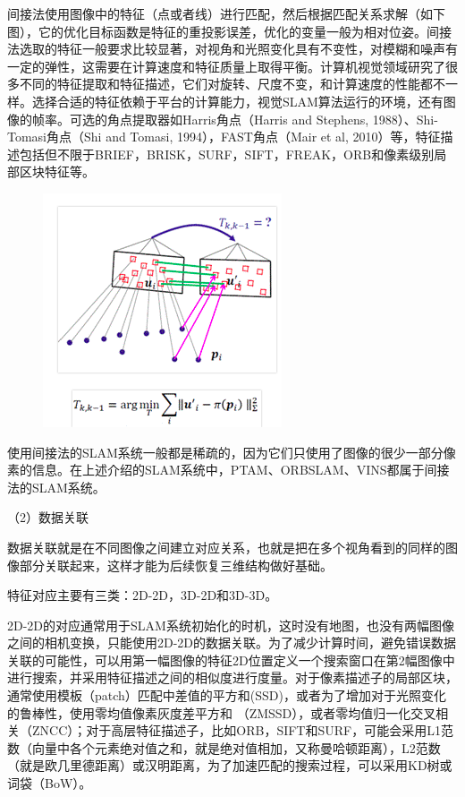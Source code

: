 间接法使用图像中的特征（点或者线）进行匹配，然后根据匹配关系求解（如下图），它的优化目标函数是特征的重投影误差，优化的变量一般为相对位姿。间接法选取的特征一般要求比较显著，对视角和光照变化具有不变性，对模糊和噪声有一定的弹性，这需要在计算速度和特征质量上取得平衡。计算机视觉领域研究了很多不同的特征提取和特征描述，它们对旋转、尺度不变，和计算速度的性能都不一样。选择合适的特征依赖于平台的计算能力，视觉SLAM算法运行的环境，还有图像的帧率。可选的角点提取器如Harris角点（Harris and Stephens, 1988）、Shi-Tomasi角点（Shi and Tomasi, 1994），FAST角点（Mair et al, 2010）等，特征描述包括但不限于BRIEF，BRISK，SURF，SIFT，FREAK，ORB和像素级别局部区块特征等。
\begin{figure}[H]%
	\centering  %
	\includegraphics[width=0.7\linewidth]{image/Talk/17.png}  %

\end{figure}

使用间接法的SLAM系统一般都是稀疏的，因为它们只使用了图像的很少一部分像素的信息。在上述介绍的SLAM系统中，PTAM、ORBSLAM、VINS都属于间接法的SLAM系统。

（2）数据关联

数据关联就是在不同图像之间建立对应关系，也就是把在多个视角看到的同样的图像部分关联起来，这样才能为后续恢复三维结构做好基础。

特征对应主要有三类：2D-2D，3D-2D和3D-3D。

2D-2D的对应通常用于SLAM系统初始化的时机，这时没有地图，也没有两幅图像之间的相机变换，只能使用2D-2D的数据关联。为了减少计算时间，避免错误数据关联的可能性，可以用第一幅图像的特征2D位置定义一个搜索窗口在第2幅图像中进行搜索，并采用特征描述之间的相似度进行度量。对于像素描述子的局部区块，通常使用模板（patch）匹配中差值的平方和(SSD)，或者为了增加对于光照变化的鲁棒性，使用零均值像素灰度差平方和 （ZMSSD），或者零均值归一化交叉相关（ZNCC）；对于高层特征描述子，比如ORB，SIFT和SURF，可能会采用L1范数（向量中各个元素绝对值之和，就是绝对值相加，又称曼哈顿距离），L2范数（就是欧几里德距离）或汉明距离，为了加速匹配的搜索过程，可以采用KD树或词袋（BoW）。

